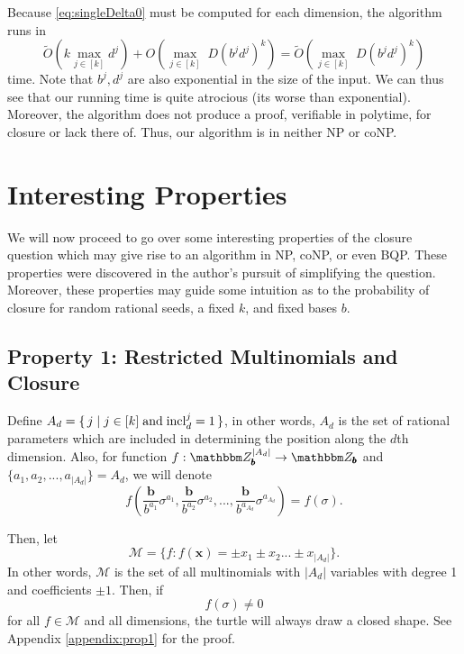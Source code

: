 \documentclass[11pt,titlepage]{article}
\newcommand{\inclIndic}[2]{{\mathrm{incl}_{#1}^{#2}}}
\newcommand{\digSumPeriodicNoJ}{{\sigma}}
\newcommand{\commonBase}{{\pmb{b}}}
\newcommand{\numbToCommonNoJ}[1]{\frac{\commonBase}{b^{#1}}}
\begin{document}
Because \eqref{eq:singleDelta0} must be computed for each dimension, the algorithm
runs in 
$$
  \widetilde{O}\left(k \max_{j \in [k]} d^j \right) + 
  O\left(\max_{j \in [k]} \; D (b^j d^j)^k \right) = 
  \widetilde{O}\left(\max_{j \in [k]} \; D (b^j d^j)^k \right)
$$
time.
Note that $b^j, d^j$ are also exponential in the size of the input. 
We can thus see that our running time is quite atrocious (its worse than exponential).
Moreover, the algorithm does not produce a proof, verifiable in polytime, for closure 
or lack there of. Thus, our algorithm is in neither NP or coNP.

\section{Interesting Properties}
We will now proceed to go over some interesting properties of the closure question
which may give rise to an algorithm in NP, coNP, or even BQP. These properties were discovered
in the author's pursuit of simplifying the question. Moreover, these properties may guide
some intuition as to the probability of closure for random rational seeds, a fixed $k$, 
and fixed bases $b$.

\subsection{Property 1: Restricted Multinomials and Closure}
\label{prop:1}
Define $A_d = \set{j \mid j \in [k] \; \text{and}\; \inclIndic{d}{j} = 1}$, in other words,
$A_d$ is the set of rational parameters which are included in determining the position along the $d$th dimension.
Also, for function $f: \Z_\commonBase^{|A_d|} \rightarrow \Z_\commonBase$ and $\{a_1, a_2, ..., a_{|A_d|} \} = A_d$, we will denote
$$
  f\left(\numbToCommonNoJ{a_1} \digSumPeriodicNoJ^{a_1}, \numbToCommonNoJ{a_2}\digSumPeriodicNoJ^{a_2}, ..., \numbToCommonNoJ{a_{A_d}}\digSumPeriodicNoJ^{a_{A_d}}\right)
  = f\left(\digSumPeriodicNoJ\right).
$$

Then, let
$$
\mathcal{M} = \{f : f(\pmb{x}) = \pm x_1 \pm x_2 ... \pm x_{|A_d|}\}.
$$
In other words, $\mathcal{M}$ is the set of all multinomials with $|A_d|$ variables with
degree 1 and coefficients $\pm1$.
Then,
if \begin{equation}
\label{eq:satisfy-multi}
f\left(\digSumPeriodicNoJ\right) \neq 0
\end{equation}
for all $f \in \mathcal{M}$ and all dimensions, the turtle will always draw a closed shape. See 
Appendix \ref{appendix:prop1} for the proof.
\end{document}
